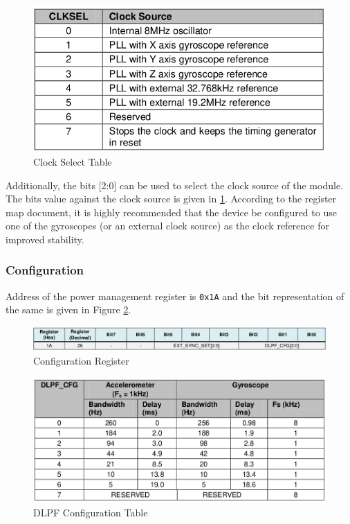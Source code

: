 \documentclass{article}
\begin{document}
	\begin{figure}[h]
		\centering
		\includegraphics[width=\textwidth]{figs/clk_sel_table.png}
		\caption{Clock Select Table \cite{mpu6050-register-map}}
		\label{fig:clk_sel_table}
	\end{figure}
	
	Additionally, the bits [2:0] can be used to select the clock source of the module. The bits value against the clock source is given in \ref{fig:clk_sel_table}. According to the register map document\cite{mpu6050-register-map}, it is highly
    recommended that the device be configured to use one of the gyroscopes (or an external clock source) as the clock reference for improved stability. 
    
    \subsubsection{Configuration}
    Address of the power management register is \texttt{0x1A} and the bit representation of the same is given in Figure \ref{fig:config_reg}.  
    
    \begin{figure}[h]
    	\centering
    	\includegraphics[width=\textwidth]{figs/reg_config.png}
    	\caption{Configuration Register \cite{mpu6050-register-map}}
    	\label{fig:config_reg}
    \end{figure}

	\begin{figure}[h]
		\centering
		\includegraphics[width=\textwidth]{figs/dlpf_config_table.png}
		\caption{DLPF Configuration Table \cite{mpu6050-register-map}}
		\label{fig:dlpf_config_table}
	\end{figure}
\end{document}

